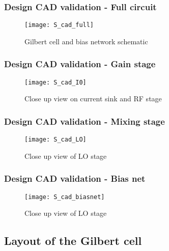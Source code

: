 \begin{frame}
	\frametitle{Design CAD validation - Full circuit}
	\begin{figure}[H]
		\centering
		\texttt{[image: S\_cad\_full]}
		\caption{Gilbert cell and bias network schematic}
		\label{S_cad_full}
	\end{figure}
\end{frame}

\begin{frame}
	\frametitle{Design CAD validation - Gain stage}
	\begin{figure}[H]
		\centering
		\texttt{[image: S\_cad\_I0]}
		\caption{Close up view on current sink and RF stage}
		\label{S_cad_I0}
	\end{figure}
\end{frame}

\begin{frame}
	\frametitle{Design CAD validation - Mixing stage}
	\begin{figure}[H]
	\centering
	\texttt{[image: S\_cad\_LO]}
	\caption{Close up view of LO stage\label{subfig-1:S_cad_LO}}
	\label{S_cad_I0}
	\end{figure}
\end{frame}

\begin{frame}
	\frametitle{Design CAD validation - Bias net }
	\begin{figure}[H]
	\centering
	\texttt{[image: S\_cad\_biasnet]}
	\caption{Close up view of LO stage\label{subfig-1:S_cad_biasnet}}
	\label{S_cad_I0}
	\end{figure}
\end{frame}

\subsection{Layout of the Gilbert cell}
\begin{frame}
	\tableofcontents[currentsubsection]
\end{frame}

